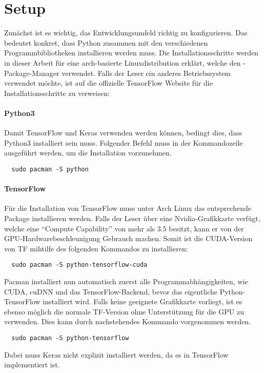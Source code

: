 \para{}
\cite{net:mnist}

\section{Setup}
Zunächst ist es wichtig, das Entwicklungsumfeld richtig zu konfigurieren. Das
bedeutet konkret, dass Python zusammen mit den verschiedenen Programmbibliotheken
installieren werden muss.
\para{}
Die Installationsschritte werden in dieser Arbeit für eine arch-basierte
Linuxdistribution erklärt, welche den -Package-Manager verwendet.
\para{}
Falls der Leser ein anderes Betriebssystem verwendet möchte, ist auf die offizielle
TensorFlow Website für die Installationsschritte zu verweisen:
\para{}

\paragraph{Python3}
Damit TensorFlow und Keras verwenden werden können, bedingt dies, dass Python3
installiert sein muss.
Folgender Befehl muss in der Kommandozeile ausgeführt werden, um die
Installation vorzunehmen.
\begin{verbatim}
  sudo pacman -S python
\end{verbatim}

\paragraph{TensorFlow}
Für die Installation von TensorFlow muss unter Arch Linux das entsprechende
Package installieren werden.
Falls der Leser über eine Nvidia-Grafikkarte verfügt, welche eine ``Compute
Capability'' von mehr als 3.5 besitzt, kann er von der
GPU-Hardwarebeschleunigung Gebrauch machen.
Somit ist die CUDA-Version von TF mihtilfe des folgenden Kommandos zu installieren:
\begin{verbatim}
  sudo pacman -S python-tensorflow-cuda
\end{verbatim}
Pacman installiert nun automatisch zuerst alle Programmabhängigkeiten, wie
CUDA, cuDNN und das TensorFlow-Backend, bevor das eigentliche
Python-TensorFlow installiert wird.
\para{}
Falls keine geeignete Grafikkarte vorliegt, ist es ebenso möglich die normale
TF-Version ohne Unterstützung für die GPU zu verwenden.
Dies kann durch nachstehendes Kommando vorgenommen werden.
\begin{verbatim}
  sudo pacman -S python-tensorflow
\end{verbatim}
\para{}
Dabei muss Keras nicht explizit installiert werden, da es in TensorFlow implementiert ist.

